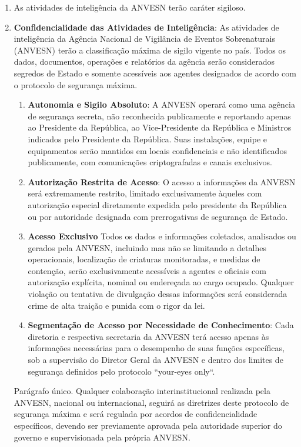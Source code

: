 \documentclass[a4paper,12pt]{report}
\begin{document}
\begin{enumerate}[resume, label=Art. \arabic*]

\item As atividades de inteligência da ANVESN terão caráter sigiloso. 

\item \textbf{Confidencialidade das Atividades de Inteligência}: As atividades de inteligência da Agência Nacional de Vigilância de Eventos Sobrenaturais (ANVESN) terão a classificação máxima de sigilo vigente no país. Todos os dados, documentos, operações e relatórios da agência serão considerados segredos de Estado e somente acessíveis aos agentes designados de acordo com o protocolo de segurança máxima.

\begin{enumerate}[label=\roman*.]

\item \textbf{Autonomia e Sigilo Absoluto}: A ANVESN operará como uma agência de segurança secreta, não reconhecida publicamente e reportando apenas ao Presidente da República, ao Vice-Presidente da República e Ministros indicados pelo Presidente da República. Suas instalações, equipe e equipamentos serão mantidos em locais confidenciais e não identificados publicamente, com comunicações criptografadas e canais exclusivos.

\item \textbf{Autorização Restrita de Acesso}: O acesso a informações da ANVESN será extremamente restrito, limitado exclusivamente àqueles com autorização especial diretamente expedida pelo presidente da República ou por autoridade designada com prerrogativas de segurança de Estado.

\item \textbf{Acesso Exclusivo} Todos os dados e informações coletados, analisados ou gerados pela ANVESN, incluindo mas não se limitando a detalhes operacionais, localização de criaturas monitoradas, e medidas de contenção, serão exclusivamente acessíveis a agentes e oficiais com autorização explícita, nominal ou endereçada ao cargo ocupado. Qualquer violação ou tentativa de divulgação dessas informações será considerada crime de alta traição e punida com o rigor da lei.

\item \textbf{Segmentação de Acesso por Necessidade de Conhecimento}: Cada diretoria e respectiva secretaria da ANVESN terá acesso apenas às informações necessárias para o desempenho de suas funções específicas, sob a supervisão do Diretor Geral da ANVESN e dentro dos limites de segurança definidos pelo protocolo ``your-eyes only``.

\end{enumerate}

Parágrafo único. Qualquer colaboração interinstitucional realizada pela ANVESN, nacional ou internacional, seguirá as diretrizes deste protocolo de segurança máxima e será regulada por acordos de confidencialidade específicos, devendo ser previamente aprovada pela autoridade superior do governo e supervisionada pela própria ANVESN.



\end{enumerate}
\end{document}
